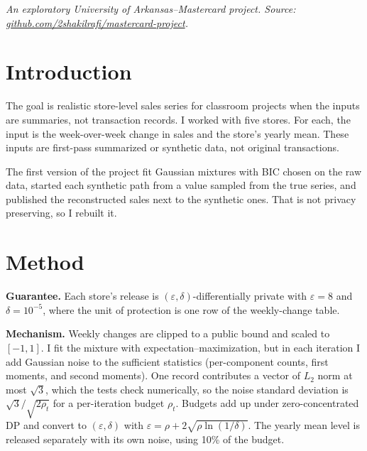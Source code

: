 

\textit{An exploratory University of Arkansas--Mastercard project. Source: \href{https://github.com/2shakilrafi/mastercard-project}{github.com/2shakilrafi/mastercard-project}.}


\section{Introduction}
The goal is realistic store-level sales series for classroom projects when the inputs are summaries, not transaction records. I worked with five stores. For each, the input is the week-over-week change in sales and the store's yearly mean. These inputs are first-pass summarized or synthetic data, not original transactions.

The first version of the project fit Gaussian mixtures with BIC chosen on the raw data, started each synthetic path from a value sampled from the true series, and published the reconstructed sales next to the synthetic ones. That is not privacy preserving, so I rebuilt it.

\section{Method}
\textbf{Guarantee.} Each store's release is $(\varepsilon,\delta)$-differentially private with $\varepsilon=8$ and $\delta=10^{-5}$, where the unit of protection is one row of the weekly-change table.

\textbf{Mechanism.} Weekly changes are clipped to a public bound and scaled to $[-1,1]$. I fit the mixture with expectation--maximization, but in each iteration I add Gaussian noise to the sufficient statistics (per-component counts, first moments, and second moments). One record contributes a vector of $L_2$ norm at most $\sqrt{3}$, which the tests check numerically, so the noise standard deviation is $\sqrt{3}/\sqrt{2\rho_t}$ for a per-iteration budget $\rho_t$. Budgets add up under zero-concentrated DP and convert to $(\varepsilon,\delta)$ with $\varepsilon=\rho+2\sqrt{\rho\ln(1/\delta)}$. The yearly mean level is released separately with its own noise, using 10\% of the budget.

